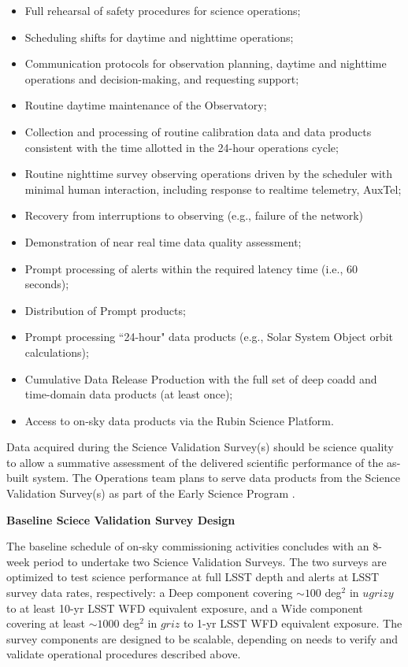 \begin{itemize}
\item Full rehearsal of safety procedures for science operations;
\item Scheduling shifts for daytime and nighttime operations;
\item Communication protocols for observation planning, daytime and nighttime operations and decision-making, and requesting support;
\item Routine daytime maintenance of the Observatory;
\item Collection and processing of routine calibration data and data products consistent with the time allotted in the 24-hour operations cycle;
\item Routine nighttime survey observing operations driven by the scheduler with minimal human interaction, including response to realtime telemetry, AuxTel;
\item Recovery from interruptions to observing (e.g., failure of the network)
\item Demonstration of near real time data quality assessment;
\item Prompt processing of alerts within the required latency time (i.e., 60 seconds);
\item Distribution of Prompt products;
\item Prompt processing ``24-hour" data products (e.g., Solar System Object orbit calculations);
\item Cumulative Data Release Production with the full set of deep coadd and time-domain data products (at least once);
\item Access to on-sky data products via the Rubin Science Platform.
\end{itemize}

Data acquired during the Science Validation Survey(s) should be science quality to allow a summative assessment of the delivered scientific performance of the as-built system.
The Operations team plans to serve data products from the Science Validation Survey(s) as part of the Early Science Program .


\textbf{Baseline Sciece Validation Survey Design}

The baseline schedule of on-sky commissioning activities concludes with an 8-week period to undertake two Science Validation Surveys.
The two surveys are optimized to test science performance at full LSST depth and alerts at LSST survey data rates, respectively: a Deep component covering $\sim100$ deg$^2$ in $ugrizy$ to at least 10-yr LSST WFD equivalent exposure, and a Wide component covering at least $\sim1000$ deg$^2$ in $griz$ to 1-yr LSST WFD equivalent exposure.
The survey components are designed to be scalable, depending on needs to verify and validate operational procedures described above.


